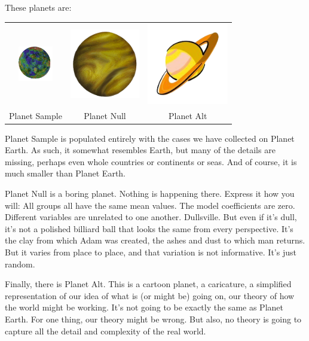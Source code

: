 These planets are:

\begin{center}
\begin{tabular}{ccc}
\includegraphics[width=0.6in]{images/planet-sample.png} &
\includegraphics[width=1.2in]{images/venus.png} &
\includegraphics[width=1.4in]{images/planet-alt.png} \\
Planet Sample & Planet Null & Planet Alt\\
\end{tabular}
\end{center}

Planet Sample is populated entirely with the cases we have collected
on Planet Earth.  As such, it somewhat resembles Earth, but many of
the details are missing, perhaps even whole countries or continents or seas.
And of course, it is much smaller than Planet Earth.

Planet Null is a boring planet.  Nothing is happening there. Express
it how you will: All groups all have the same mean values.
The model coefficients are zero. Different variables are unrelated to
one another.  Dullsville.  But even if it's dull, it's not a polished
billiard ball that looks the same from every perspective.  It's the
clay from which Adam was created, the ashes and dust to which man
returns.  But it varies from place to place, and that variation is not
informative. It's just random.

Finally, there is Planet Alt.  This is a cartoon planet, a caricature,
a simplified representation of our idea of what is (or might be) going on, 
our theory of how the world might be working.  It's not going to be exactly the
same as Planet Earth.  For one thing, our theory might be wrong.  But
also, no theory is going to capture all the detail and complexity of
the real world.

